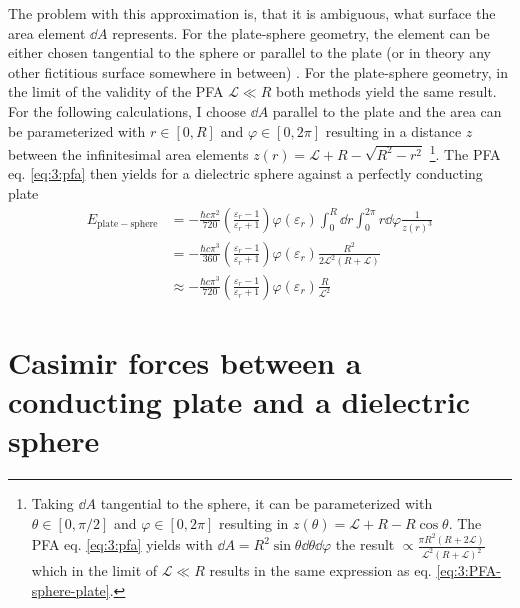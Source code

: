 The problem with this approximation is, that it is ambiguous, what surface the area element $\dd A$ represents. For the plate-sphere geometry, the element can be either chosen tangential to the sphere or parallel to the plate (or in theory any other fictitious surface somewhere in between) \cite{Bulgac_2006}.
For the plate-sphere geometry, in the limit of the validity of the PFA $\mathscr{L} \ll R$ both methods yield the same result.
For the following calculations, I choose $\dd A$ parallel to the plate and the area can be parameterized with $r\in [0, R]$ and $\varphi \in [0, 2\pi]$ resulting in a distance $z$ between the infinitesimal area elements $z(r) = \mathscr{L} + R - \sqrt{R^2 - r^2}$ \footnote{Taking $\dd A$ tangential to the sphere, it can be parameterized with $\theta \in [0, \pi/2]$ and $\varphi \in [0, 2\pi]$ resulting in $z(\theta) = \mathscr{L} + R - R\cos\theta$. The PFA eq. \eqref{eq:3:pfa} yields with $\dd A = R^2\sin\theta\dd\theta\dd\varphi$ the result $\propto \frac{\pi R^2(R + 2\mathscr{L})}{\mathscr{L}^2(R+\mathscr{L})^2}$ which in the limit of $\mathscr{L} \ll R$ results in the same expression as eq. \eqref{eq:3:PFA-sphere-plate}.}. The PFA eq. \eqref{eq:3:pfa} then yields for a dielectric sphere against a perfectly conducting plate
\begin{align}
  E_\mathrm{plate-sphere} &= -\frac{\hbar c \pi^2}{720} \left(\frac{\varepsilon_r - 1}{\varepsilon_r + 1}\right) \varphi(\varepsilon_r) \int_0^R \dd r \int_0^{2\pi} r\dd \varphi \frac{1}{z(r)^3} \\
  &= -\frac{\hbar c \pi^3}{360} \left(\frac{\varepsilon_r - 1}{\varepsilon_r + 1}\right) \varphi(\varepsilon_r) \frac{R^2}{2\mathscr{L}^2(R + \mathscr{L})} \\
  &\approx -\frac{\hbar c \pi^3}{720} \left(\frac{\varepsilon_r - 1}{\varepsilon_r + 1}\right) \varphi(\varepsilon_r) \frac{R}{\mathscr{L}^2} \label{eq:3:PFA-sphere-plate}
\end{align}




\section{Casimir forces between a conducting plate and a dielectric sphere}
\label{sec:3:casimir-plate-sphere}

